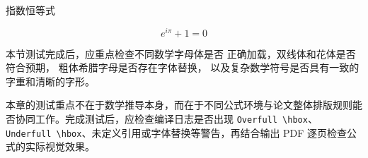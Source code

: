 指数恒等式

\begin{equation}
  e^{i\pi}+1=0
\end{equation}


本节测试完成后，应重点检查不同数学字母体是否
正确加载，双线体和花体是否符合预期，
粗体希腊字母是否存在字体替换，
以及复杂数学符号是否具有一致的字重和清晰的字形。







本章的测试重点不在于数学推导本身，而在于不同公式环境与论文整体排版规则能否协同工作。完成测试后，应检查编译日志是否出现 \texttt{Overfull \textbackslash hbox}、\texttt{Underfull \textbackslash hbox}、未定义引用或字体替换等警告，再结合输出 PDF 逐页检查公式的实际视觉效果。